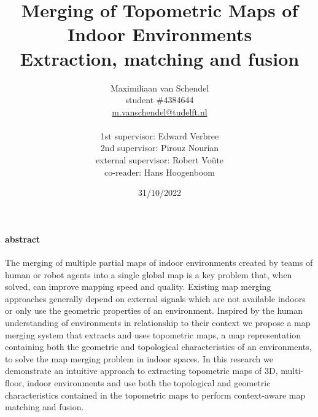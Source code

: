 \documentclass{article}
\title{Merging of Topometric Maps of Indoor Environments \\ \large Extraction, matching and fusion}
\author{
  Maximiliaan van Schendel\\
  student \#4384644 \\
  \url{m.vanschendel@tudelft.nl}\\
  \\
  1st supervisor: Edward Verbree \\
  2nd supervisor: Pirouz Nourian \\
  external supervisor: Robert Voûte \\
  co-reader: Hans Hoogenboom \\
}
\date{31/10/2022}
\begin{document}



\maketitle
\pagebreak

\tableofcontents
\newpage



\paragraph{abstract}
The merging of multiple partial \gls{map}s of indoor environments created by teams of human or robot agents into a single global map is a key problem that, when solved, can improve mapping speed and quality. Existing map merging approaches generally depend on external signals which are not available indoors or only use the geometric properties of an environment. Inspired by the human understanding of environments in relationship to their context we propose a map merging system that extracts and uses topometric maps, a map representation containing both the geometric and topological characteristics of an environments, to solve the map merging problem in indoor spaces. In this research we demonstrate an intuitive approach to extracting topometric maps of 3D, multi-floor, indoor environments and use both the topological and geometric characteristics contained in the topometric maps to perform context-aware map matching and fusion. 


\clearpage
\printnoidxglossaries



\pagebreak

\pagebreak

\pagebreak                                                     

\pagebreak

\pagebreak





\end{document}
